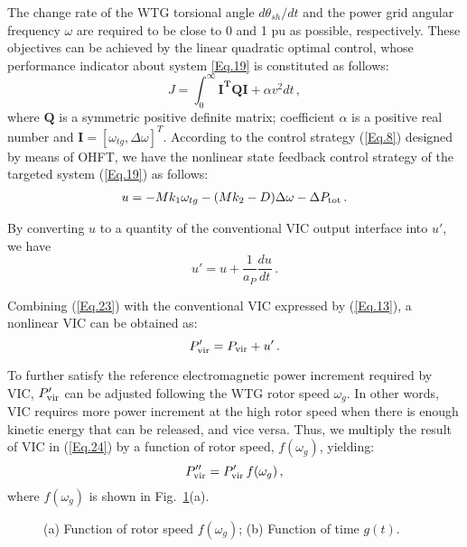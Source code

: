 \documentclass[journal]{IEEEtran}
\begin{document}
The change rate of the WTG torsional angle $d\theta_{sh}/{dt}$ and the power grid angular frequency $\omega$ are required to be close to 0 and 1 pu as possible, respectively. These objectives can be achieved by the linear quadratic optimal control, whose performance indicator about system \eqref{Eq.19} is constituted as follows:
%
\begin{equation}
  J=\int_0^\infty \bm{I^TQI}+\alpha v^2dt \, ,
  \label{Eq.21}
\end{equation}
where $\bm{Q}$ is a symmetric positive definite matrix; coefficient $\alpha$ is a positive real number and $\bm{I}=[\omega_{tg}, \Delta \omega]^T$.
According to the control strategy (\ref{Eq.8}) designed by means of OHFT, we have the nonlinear state feedback control strategy of the targeted system (\ref{Eq.19}) as follows:
%
\begin{equation}
  \begin{split}
    u=-Mk_1\omega_{tg} -
    (Mk_2-D)\Delta \omega - \Delta P_{\rm tot} \, .
  \end{split}
  \label{Eq.22}
\end{equation}

By converting $u$ to a quantity of the conventional VIC output interface into $u'$, we have
\begin{equation}
  u' =u+\frac{1}{a_P}\frac{du}{dt} \, .
  \label{Eq.23}
\end{equation}

Combining (\ref{Eq.23}) with the conventional VIC expressed by (\ref{Eq.13}), a nonlinear VIC can be obtained as:
%
\begin{equation}
  \label{Eq.24}
  P'_{\rm vir}= P_{\rm vir} + u'  \, .
\end{equation}

To further satisfy the reference electromagnetic power increment required by VIC, $P'_{\rm vir}$ can be adjusted following the WTG rotor speed $\omega_g$. In other words, VIC requires more power increment at the high rotor speed when there is enough kinetic energy that can be released, and vice versa. Thus, we multiply the result of VIC in (\ref{Eq.24}) by a function of rotor speed, $f(\omega_g)$, yielding:
%
\begin{equation}
  P''_{\rm vir}= P'_{\rm vir} \, f(\omega_g) \, ,
  \label{Eq.25}
\end{equation}
where $f(\omega_g)$ is shown in Fig.~\ref{Fig.3}(a).

\begin{figure}
  \centering
  \centering
  \caption{(a) Function of rotor speed $f(\omega_g)$; (b) Function
    of time $g(t)$.}
  \label{Fig.3}
\end{figure}
\end{document}
